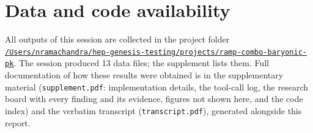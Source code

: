 \documentclass[11pt,a4paper]{article}
\begin{document}
\section*{Data and code availability}
All outputs of this session are collected in the project folder \href{file:///Users/nramachandra/hep-genesis-testing/projects/ramp-combo-baryonic-pk}{\texttt{/\allowbreak{}Users/\allowbreak{}nramachandra/\allowbreak{}hep-genesis-testing/\allowbreak{}projects/\allowbreak{}ramp-combo-baryonic-pk}}.
The session produced 13 data files; the supplement lists them.
Full documentation of how these results were obtained is in the supplementary material (\texttt{supplement.pdf}: implementation details, the tool-call log, the research board with every finding and its evidence, figures not shown here, and the code index) and the verbatim transcript (\texttt{transcript.pdf}), generated alongside this report.
\end{document}
